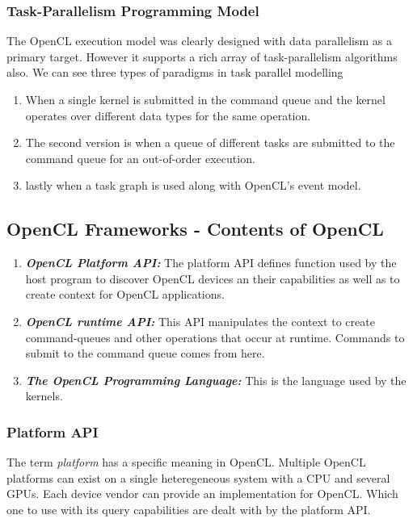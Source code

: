 
\subsubsection{Task-Parallelism Programming Model}
The OpenCL execution model was clearly designed with data parallelism as a primary target. However it supports a rich array of task-parallelism algorithms also. We can see three types of paradigms in task parallel modelling
\begin{enumerate}
	\item When a single kernel is submitted in the command queue and the kernel operates over different data types for the same operation.
	\item The second version is when a queue of different tasks are submitted to the command queue for an out-of-order execution.
	\item lastly when a task graph is used along with OpenCL's event model.
\end{enumerate}
\subsection{OpenCL Frameworks - Contents of OpenCL}

\begin{enumerate}
	\item \textit{\textbf{OpenCL Platform API:}} The platform API defines function used by the host program to discover OpenCL devices an their capabilities as well as to create context for OpenCL applications.
	\item \textit{\textbf{OpenCL runtime API:}} This API manipulates the context to create command-queues and other operations that occur at runtime. Commands to submit to the command queue comes from here.
	\item \textit{\textbf{The OpenCL Programming Language:}} This is the language used by the kernels.
\end{enumerate}

\subsubsection{Platform API}
The term \textit{platform} has a specific meaning in OpenCL. Multiple OpenCL platforms can exist on a single heteregeneous system with a CPU and several GPUs. Each device vendor can provide an implementation for OpenCL. Which one to use with its query capabilities are dealt with by the platform API. 

